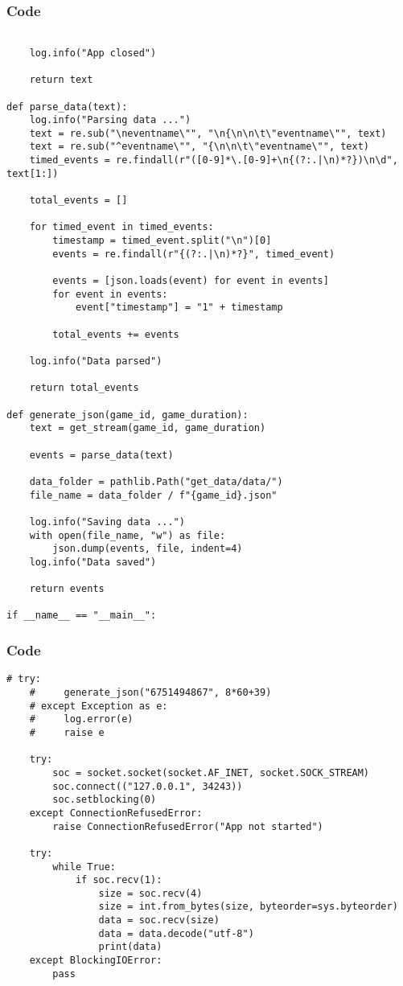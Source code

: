 \documentclass{beamer}
\begin{document}
\begin{frame}[fragile]
    \frametitle{Code}
    \fontsize{3pt}{5pt}\selectfont
    \begin{verbatim}

    log.info("App closed")

    return text

def parse_data(text):
    log.info("Parsing data ...")
    text = re.sub("\neventname\"", "\n{\n\n\t\"eventname\"", text)
    text = re.sub("^eventname\"", "{\n\n\t\"eventname\"", text)
    timed_events = re.findall(r"([0-9]*\.[0-9]+\n{(?:.|\n)*?})\n\d", text[1:])

    total_events = []

    for timed_event in timed_events:
        timestamp = timed_event.split("\n")[0]
        events = re.findall(r"{(?:.|\n)*?}", timed_event)

        events = [json.loads(event) for event in events]
        for event in events:
            event["timestamp"] = "1" + timestamp
        
        total_events += events

    log.info("Data parsed")

    return total_events

def generate_json(game_id, game_duration):
    text = get_stream(game_id, game_duration)
    
    events = parse_data(text)

    data_folder = pathlib.Path("get_data/data/")
    file_name = data_folder / f"{game_id}.json"

    log.info("Saving data ...")
    with open(file_name, "w") as file:
        json.dump(events, file, indent=4)
    log.info("Data saved")
    
    return events

if __name__ == "__main__":
    \end{verbatim}
\end{frame}

\begin{frame}[t, fragile]
    \frametitle{Code}
    \fontsize{3pt}{5pt}\selectfont
    \begin{verbatim}
# try:
    #     generate_json("6751494867", 8*60+39)
    # except Exception as e:
    #     log.error(e)
    #     raise e
    
    try:
        soc = socket.socket(socket.AF_INET, socket.SOCK_STREAM)
        soc.connect(("127.0.0.1", 34243))
        soc.setblocking(0)
    except ConnectionRefusedError:
        raise ConnectionRefusedError("App not started")

    try:
        while True:
            if soc.recv(1):
                size = soc.recv(4)
                size = int.from_bytes(size, byteorder=sys.byteorder)
                data = soc.recv(size)
                data = data.decode("utf-8")
                print(data)
    except BlockingIOError:
        pass
    \end{verbatim}
\end{frame}
\end{document}
